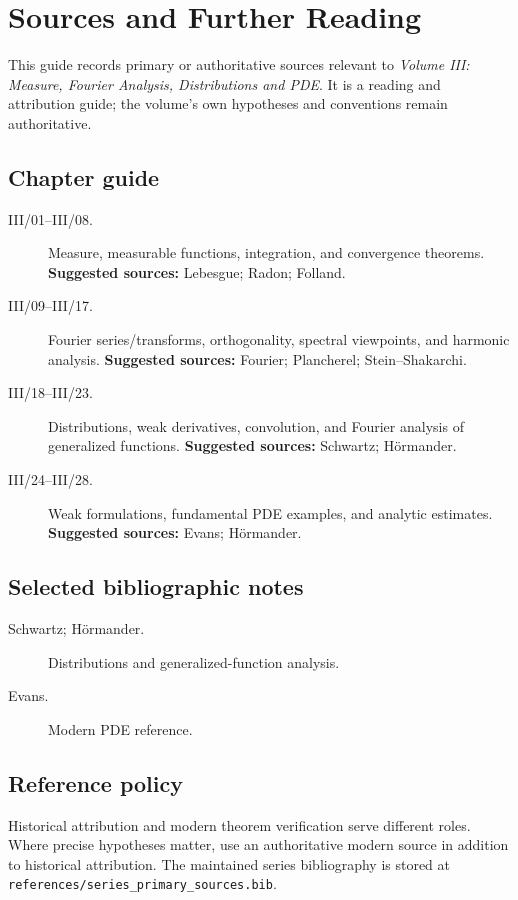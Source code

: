\chapter*{Sources and Further Reading}
{}

This guide records primary or authoritative sources relevant to \emph{Volume III: Measure, Fourier Analysis, Distributions and PDE}.
It is a reading and attribution guide; the volume's own hypotheses and conventions remain authoritative.

\section*{Chapter guide}
\begin{description}
\item[III/01--III/08.] Measure, measurable functions, integration, and convergence theorems.
\textbf{Suggested sources:} Lebesgue; Radon; Folland.

\item[III/09--III/17.] Fourier series/transforms, orthogonality, spectral viewpoints, and harmonic analysis.
\textbf{Suggested sources:} Fourier; Plancherel; Stein--Shakarchi.

\item[III/18--III/23.] Distributions, weak derivatives, convolution, and Fourier analysis of generalized functions.
\textbf{Suggested sources:} Schwartz; Hörmander.

\item[III/24--III/28.] Weak formulations, fundamental PDE examples, and analytic estimates.
\textbf{Suggested sources:} Evans; Hörmander.

\end{description}

\section*{Selected bibliographic notes}
\begin{description}
\item[Schwartz; Hörmander.] Distributions and generalized-function analysis.

\item[Evans.] Modern PDE reference.

\end{description}

\section*{Reference policy}
Historical attribution and modern theorem verification serve different roles.
Where precise hypotheses matter, use an authoritative modern source in addition to historical attribution.
The maintained series bibliography is stored at \texttt{references/series\_primary\_sources.bib}.
